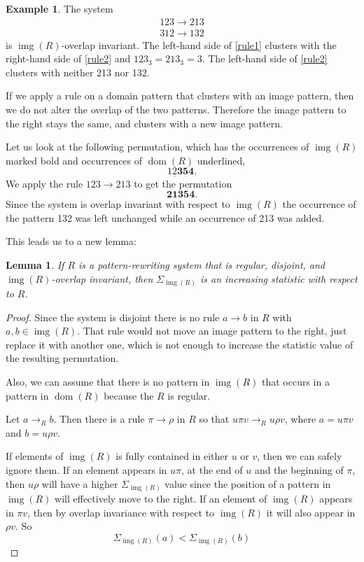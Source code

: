 \documentclass[a4paper, 11pt, english]{article}
\newcommand{\patternrule}{ \to \!}
\newtheorem{lemma}[theorem]{Lemma}
\theoremstyle{definition}
\newtheorem{example}[theorem]{Example}
\DeclareMathOperator{\dom}{dom}
\DeclareMathOperator{\img}{img}
\begin{document}
\begin{example}
  The system
  \begin{align*}
    123 \patternrule 213 \label{rule1} \tag{1} \\
    312 \patternrule 132 \label{rule2} \tag{2}
  \end{align*}
  is $\img(R)$-overlap invariant. The left-hand side of \eqref{rule1} clusters with the right-hand side of
  \eqref{rule2} and $123_3 = 213_3 = 3$. The left-hand side of \eqref{rule2} clusters with neither 213 nor 132.

  If we apply a rule on a domain pattern that clusters with an image pattern, then we
  do not alter the overlap of the two patterns. Therefore the image pattern to the right stays the
  same, and clusters with a new image pattern.
  
  Let us look at the following permutation, which has the occurrences of $\img(R)$ marked bold and
  occurrences of $\dom(R)$ underlined,
  \[
    \underline{12\bm{3}}\bm{54}.
  \]
  We apply the rule $123 \patternrule 213$ to get the permutation
  \[
    \bm{21\bm{3}}\bm{54}.
  \]
  Since the system is overlap invariant with respect to $\img(R)$ the occurrence of the pattern 132 was left unchanged while
  an occurrence of 213 was added.
\end{example}

This leads us to a new lemma:
\begin{lemma}
  If $R$ is a pattern-rewriting system that is regular, disjoint, and $\img(R)$-overlap invariant,
  then $\Sigma_{\img(R)}$ is an increasing statistic with respect to $R$. 
\end{lemma}
\begin{proof}
  Since the system is disjoint there is no rule $a \patternrule b$ in $R$ with $a, b \in \img(R)$.
  That rule would not move an image pattern to the right, just replace it with another one, which is
  not enough to increase the statistic value of the resulting permutation.

  Also, we can assume that there is no pattern in $\img(R)$ that occurs in a pattern in $\dom(R)$
  because the $R$ is regular.

  Let $a \to_R b$. Then there is a rule $\pi \patternrule \rho$ in
  $R$ so that $u \pi v \to_R u \rho v$, where $a = u \pi v$ and $b =
  u \rho v$. 

  If elements of $\img(R)$ is fully contained in either $u$ or $v$, then we
  can safely ignore them. If an element appears in $u\pi$, at the end of $u$ and the beginning of
  $\pi$, then $u \rho$ will have a higher $\Sigma_{\img(R)}$ value since the position of a pattern in $\img(R)$ will
  effectively move to the right. If an element of $\img(R)$ appears in $\pi v$,
  then by overlap invariance with respect to $\img(R)$ it will also appear in $\rho v$.
  So
  \[
      \Sigma_{\img(R)}(a) < \Sigma_{\img(R)}(b)
  \]

\end{proof}
\end{document}
